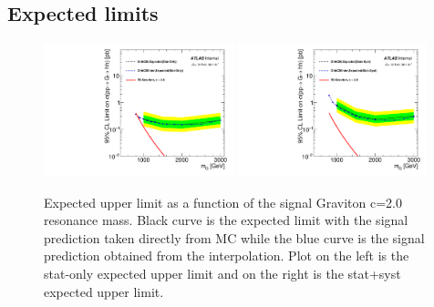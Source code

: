 \subsection{Expected limits}
\label{app:boosted_siginter_limit}

\begin{figure}[!h]
\begin{center}
\includegraphics*[width=0.49\textwidth]{./figures/boosted/SigInterpolation/Limits_GravitonC20_MCvsInterpolation_StatOnly}
\includegraphics*[width=0.49\textwidth]{./figures/boosted/SigInterpolation/Limits_GravitonC20_MCvsInterpolation_Systs}
\caption{Expected upper limit as a function of the signal Graviton c=2.0 resonance mass. Black curve is the expected
limit with the signal prediction taken directly from MC while the blue curve is the signal prediction obtained from the interpolation.
Plot on the left is the stat-only expected upper limit and on the right is the stat+syst expected upper limit.}
\label{fig:boosted_siginter_templates_limits_c20}
\end{center}
\end{figure}
\FloatBarrier

